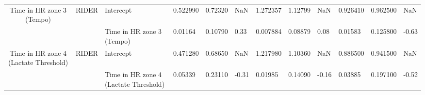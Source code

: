 \begin{tabular}{c}
Time in HR zone 3 (Tempo) & RIDER & Intercept &  0.522990 &  0.72320 &   NaN &  1.272357 &  1.12799 &   NaN &   0.926410 &  0.962500 &   NaN \\
                                      &       & Time in HR zone 3 (Tempo) &   0.01164 &  0.10790 &  0.33 &  0.007884 &  0.08879 &  0.08 &    0.01583 &  0.125800 & -0.63 \\
Time in HR zone 4 (Lactate Threshold) & RIDER & Intercept &  0.471280 &  0.68650 &   NaN &  1.217980 &  1.10360 &   NaN &   0.886500 &  0.941500 &   NaN \\
                                      &       & Time in HR zone 4 (Lactate Threshold) &   0.05339 &  0.23110 & -0.31 &   0.01985 &  0.14090 & -0.16 &    0.03885 &  0.197100 & -0.52 \\
\bottomrule
\end{tabular}
